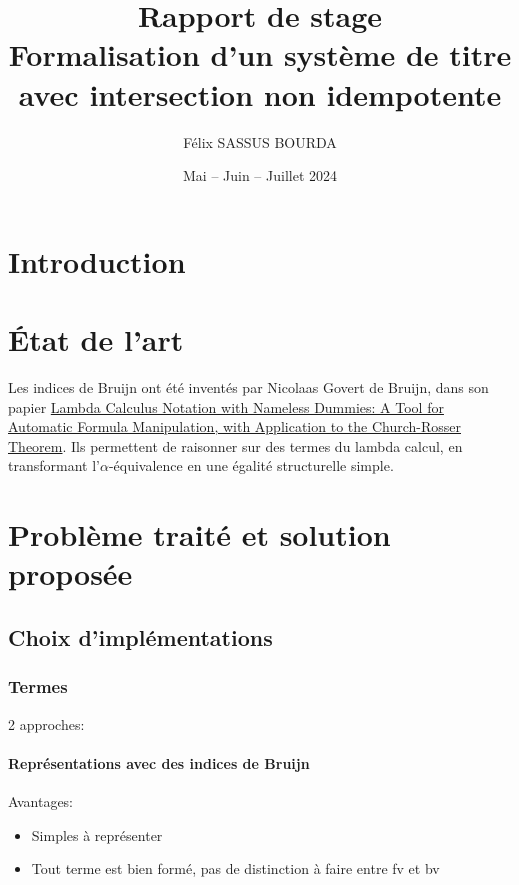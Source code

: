 \documentclass[12pt]{article}
\author{Félix SASSUS BOURDA}
\title{
    Rapport de stage \\ 
    Formalisation d'un système de titre avec intersection non idempotente
}
\date{
  Mai -- Juin -- Juillet 2024
}
\begin{document}
\large
\maketitle
\newpage

\section{Introduction}


\newpage

\section{État de l'art}
Les indices de Bruijn ont été inventés par Nicolaas Govert de Bruijn, dans son papier \href{http://alexandria.tue.nl/repository/freearticles/597619.pdf}{Lambda Calculus Notation with Nameless Dummies: A Tool for Automatic Formula Manipulation, with Application to the Church-Rosser Theorem}. Ils permettent de raisonner sur des termes du lambda calcul, en transformant l'$\alpha$-équivalence en une égalité structurelle simple.










\newpage

\section{Problème traité et solution proposée}
\subsection{Choix d'implémentations}

\subsubsection{Termes}

2 approches:
\paragraph{Représentations avec des indices de Bruijn}
Avantages:
\begin{itemize}
  \item Simples à représenter
  \item Tout terme est bien formé, pas de distinction à faire entre fv et bv
\end{itemize}
\end{document}
